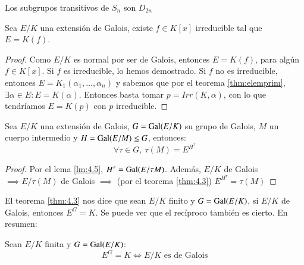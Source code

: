 \begin{obs}
    Los subgrupos transitivos de $S_n$ son $D_{2n}$
\end{obs}

\begin{pro}
    Sea $E/K$ una extensión de Galois, existe $f \in K[x]$ irreducible tal que $E = K(f)$.
\end{pro}

\begin{proof}
    Como $E/K$ es normal por ser de Galois, entonces $E = K(f)$, para algún $f \in K[x]$. Si $f$ es irreducible, lo hemos demostrado. Si $f$ no es irreducible, entonces $E = K_1(\alpha_1, \ldots, \alpha_n)$ y sabemos que por el teorema \ref{thm:elemprim}, $\exists \alpha \in E: E = K(\alpha)$. Entonces basta tomar $p = Irr(K, \alpha)$, con lo que tendríamos $E = K(p)$ con $p$ irreducible.
\end{proof}

\begin{pro}
    Sea $E/K$ una extensión de Galois, $G = \mathrm{Gal}(E/K)$ su grupo de Galois, $M$ un cuerpo intermedio y $H = \mathrm{Gal}(E/M) \leq G$, entonces:
    $$
        \forall \tau \in G,\ \tau(M) = E^{H^\tau}
    $$
\end{pro}
\begin{proof}
    Por el lema \ref{lm:4.5}, $H^\tau = \mathrm{Gal}(E/\tau{M})$. Además, $E/K$ de Galois $\implies E/\tau(M)$ de Galois $\implies$ (por el teorema \ref{thm:4.3}) $E^{H^{\tau}} = \tau(M)$
\end{proof}

\begin{obs}
    El teorema \ref{thm:4.3} nos dice que sean $E/K$ finito y $G = \mathrm{Gal}(E/K)$, si $E/K$ de Galois, entonces $E^G=K$. Se puede ver que el recíproco también es cierto. En resumen:\\

    \begin{center}
        Sean $E/K$ finita y $G=\mathrm{Gal}(E/K)$:
        $$
            E^G = K \iff E/K \text{ es de Galois}
        $$
    \end{center}
\end{obs}

